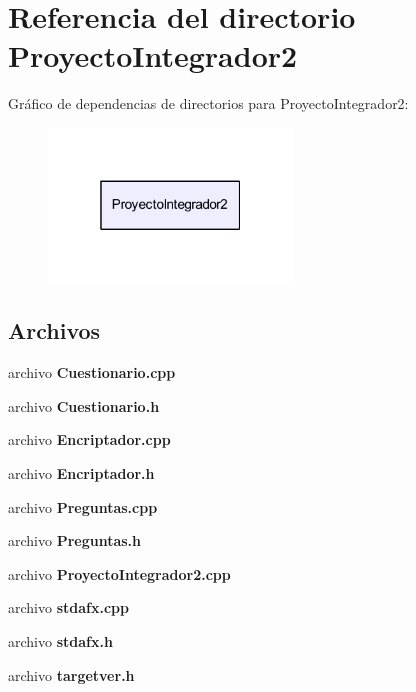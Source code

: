 \section{Referencia del directorio Proyecto\-Integrador2}
\label{dir_dd295ae4e78f04c695809609e0076f06}
Gráfico de dependencias de directorios para Proyecto\-Integrador2\-:
\nopagebreak
\begin{figure}[H]
\begin{center}
\leavevmode
\includegraphics[width=184pt]{dir_dd295ae4e78f04c695809609e0076f06_dep}
\end{center}
\end{figure}
\subsection*{Archivos}
\begin{DoxyCompactItemize}
\item 
archivo {\bf Cuestionario.\-cpp}
\item 
archivo {\bf Cuestionario.\-h}
\item 
archivo {\bf Encriptador.\-cpp}
\item 
archivo {\bf Encriptador.\-h}
\item 
archivo {\bf Preguntas.\-cpp}
\item 
archivo {\bf Preguntas.\-h}
\item 
archivo {\bf Proyecto\-Integrador2.\-cpp}
\item 
archivo {\bf stdafx.\-cpp}
\item 
archivo {\bf stdafx.\-h}
\item 
archivo {\bf targetver.\-h}
\end{DoxyCompactItemize}
